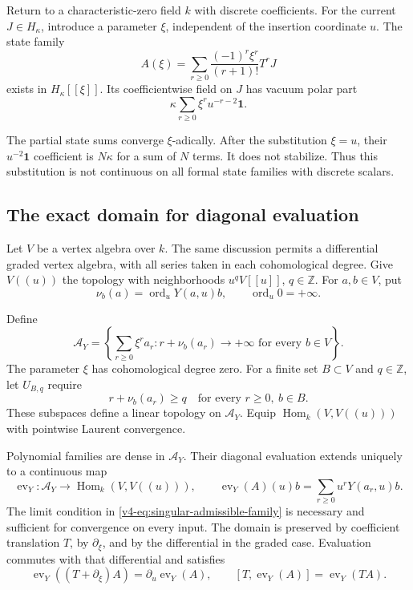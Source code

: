 Return to a characteristic-zero field \(k\)
with discrete coefficients. For the current
\(J\in H_\kappa\), introduce a parameter
\(\xi\), independent of the insertion coordinate \(u\).
The state family
\[
 A(\xi)=\sum_{r\geq0}
             \frac{(-1)^r\xi^r}{(r+1)!}T^rJ
\]
exists in \(H_\kappa[[\xi]]\).
Its coefficientwise field on \(J\) has vacuum
polar part
\[
                         \kappa\sum_{r\geq0}\xi^ru^{-r-2}\mathbf1.
\]

The partial state sums converge \(\xi\)-adically.
After the substitution \(\xi=u\), their
\(u^{-2}\mathbf1\) coefficient is \(N\kappa\)
for a sum of \(N\) terms. It does not stabilize.
Thus this substitution is not continuous
on all formal state families with discrete scalars.

\subsection{The exact domain for diagonal evaluation}

Let \(V\) be a vertex algebra over \(k\).
The same discussion permits a differential
graded vertex algebra, with all series taken
in each cohomological degree.
Give \(V((u))\) the topology with neighborhoods
\(u^qV[[u]]\), \(q\in\mathbb Z\).
For \(a,b\in V\), put
\[
 \nu_b(a)=\operatorname{ord}_uY(a,u)b,\qquad
                         \operatorname{ord}_u0=+\infty.
\]

Define
\begin{equation}\label{v4-eq:singular-admissible-family}
 \mathscr A_Y=
   \left\{\sum_{r\geq0}\xi^ra_r:
          r+\nu_b(a_r)\longrightarrow+\infty
                             \text{ for every }b\in V\right\}.
\end{equation}
The parameter \(\xi\) has cohomological degree zero.
For a finite set \(B\subset V\) and \(q\in\mathbb Z\),
let \(U_{B,q}\) require
\[
                   r+\nu_b(a_r)\geq q
                   \quad\text{for every }r\geq0,\ b\in B.
\]
These subspaces define a linear topology on
\(\mathscr A_Y\).
Equip \(\operatorname{Hom}_k(V,V((u)))\)
with pointwise Laurent convergence.

\begin{proposition}\label{v4-prop:singular-diagonal-evaluation}
Polynomial families are dense in \(\mathscr A_Y\).
Their diagonal evaluation extends uniquely to
a continuous map
\[
 \operatorname{ev}_Y:\mathscr A_Y
                 \longrightarrow\operatorname{Hom}_k(V,V((u))),
 \qquad
 \operatorname{ev}_Y(A)(u)b=\sum_{r\geq0}u^rY(a_r,u)b.
\]
The limit condition in
\eqref{v4-eq:singular-admissible-family}
is necessary and sufficient for convergence
on every input.
The domain is preserved by coefficient
translation \(T\), by \(\partial_\xi\),
and by the differential in the graded case.
Evaluation commutes with that differential and satisfies
\[
 \operatorname{ev}_Y((T+\partial_\xi)A)
                         =\partial_u\operatorname{ev}_Y(A),
 \qquad
 [T,\operatorname{ev}_Y(A)]=\operatorname{ev}_Y(TA).
\]
\end{proposition}

